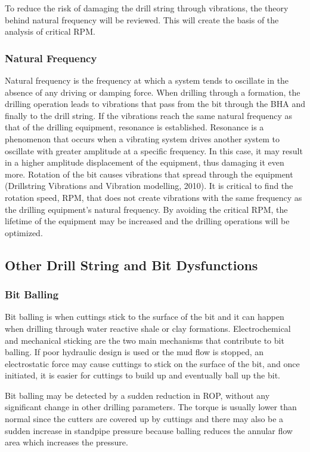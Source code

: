 To reduce the risk of damaging the drill string through vibrations, the theory behind natural frequency will be reviewed. This will create the basis of the analysis of critical RPM.

\subsubsection{Natural Frequency}
Natural frequency is the frequency at which a system tends to oscillate in the absence of any driving or damping force. When drilling through a formation, the drilling operation leads to vibrations that pass from the bit through the BHA and finally to the drill string. If the vibrations reach the same natural frequency as that of the drilling equipment, resonance is established. 
Resonance is a phenomenon that occurs when a vibrating system drives another system to oscillate with greater amplitude at a specific frequency. In this case, it may result in a higher amplitude displacement of the equipment, thus damaging it even more. 
Rotation of the bit causes vibrations that spread through the equipment (Drillstring Vibrations and Vibration modelling, 2010). It is critical to find the rotation speed, RPM, that does not create vibrations with the same frequency as the drilling equipment’s natural frequency. By avoiding the critical RPM, the lifetime of the equipment may be increased and the drilling operations will be optimized. 

\subsection{Other Drill String and Bit Dysfunctions}

\subsubsection{Bit Balling}
Bit balling is when cuttings stick to the surface of the bit and it can happen when drilling through water reactive shale or clay formations. Electrochemical and mechanical sticking are the two main mechanisms that contribute to bit balling. If poor hydraulic design is used or the mud flow is stopped, an electrostatic force may cause cuttings to stick on the surface of the bit, and once initiated, it is easier for cuttings to build up and eventually ball up the bit. \cite{schlumvib} 

Bit balling may be detected by a sudden reduction in ROP, without any significant change in other drilling parameters. The torque is usually lower than normal since the cutters are covered up by cuttings and there may also be a sudden increase in standpipe pressure because balling reduces the annular flow area which increases the pressure. \cite{bitballing}

